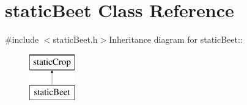 \hypertarget{classstatic_beet}{
\section{staticBeet Class Reference}
\label{classstatic_beet}
}


{\ttfamily \#include $<$staticBeet.h$>$}Inheritance diagram for staticBeet::\begin{figure}[H]
\begin{center}
\leavevmode
\includegraphics[height=2cm]{classstatic_beet}
\end{center}
\end{figure}
